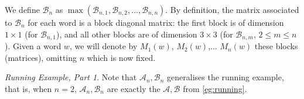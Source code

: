 \documentclass{lmcs}
\theoremstyle{remark}
\newcommand{\autB}{\mathcal{B}}
\theoremstyle{remark}
\newtheorem{runningexample/}{Running Example, Part}
\newenvironment{runningexample}
  {\renewcommand{\qedsymbol}{\color{darkgray}\ensuremath{\lrcorner}}%
   \pushQED{\qed}\begin{runningexample/}}
  {\popQED\end{runningexample/}}
\begin{document}
We define $\mathcal{B}_n$ as $\max(\mathcal{B}_{n,1}, \mathcal{B}_{n,2}, ..., \mathcal{B}_{n,n})$. By definition, the matrix associated to $\mathcal{B}_n$ for each word is a block diagonal matrix: the first block is of dimension $1 \times 1$ (for $\autB_{n,1}$), and all other blocks are of dimension $3\times 3$ (for $\autB_{n,m}$, $2 \leq m \leq n$). Given a word $w$, we will denote by $M_1(w)$, $M_2(w)$,... $M_n(w)$ these blocks (matrices), omitting $n$ which is now fixed.  

\begin{runningexample}
Note that $\mathcal{A}_n,\mathcal{B}_n$ generalises the running example, that is, when $n = 2$, $\mathcal{A}_n,\mathcal{B}_n$ are exactly the $\mathcal{A},\mathcal{B}$ from \cref{eg:running}. 
\end{runningexample}
\end{document}
